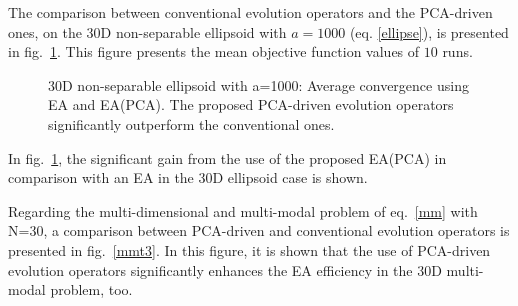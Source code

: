 The comparison between conventional evolution operators and the PCA-driven ones, on the 30D non-separable ellipsoid with $a\!=\!1000$ (eq. \ref{ellipse}), is presented in fig.\ \ref{Ellt3}. This figure presents the mean objective function values of $10$ runs. 

\begin{figure}[h!]
\begin{minipage}[b]{1\linewidth}
 \centering
\end{minipage}
\caption{30D non-separable ellipsoid with a=1000: Average convergence using EA and EA(PCA). The proposed PCA-driven evolution operators significantly outperform the conventional ones.} 
\label{Ellt3}
\end{figure}

In fig.\ \ref{Ellt3}, the significant gain from the use of the proposed EA(PCA) in comparison with an EA in the 30D ellipsoid case is shown.

Regarding the multi-dimensional and multi-modal problem of eq.\ \ref{mm} with N=30, a comparison between PCA-driven and conventional evolution operators is presented in fig.\ \ref{mmt3}.  In this figure, it is shown that the use of PCA-driven evolution operators significantly enhances the EA efficiency in the 30D multi-modal problem, too.


